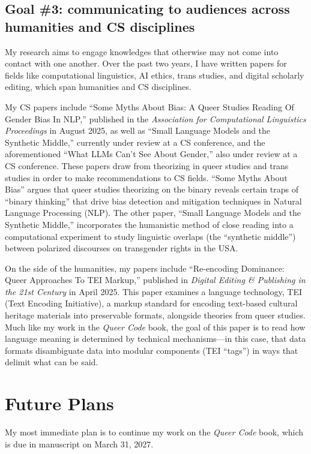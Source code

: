 \documentclass[12pt]{article}
\begin{document}
\subsection*{Goal \#3: communicating to audiences across humanities and CS disciplines}
\label{sec:org2d70bbc}
My research aims to engage knowledges that otherwise may not come into
contact with one another. Over the past two years, I have written
papers for fields like computational linguistics, AI ethics, trans
studies, and digital scholarly editing, which span humanities and CS
disciplines.

My CS papers include ``Some Myths About Bias: A Queer Studies Reading
Of Gender Bias In NLP,'' published in the \emph{Association for
Computational Linguistics Proceedings} in August 2025, as well as
``Small Language Models and the Synthetic Middle,'' currently under
review at a CS conference, and the aforementioned ``What LLMs Can't
See About Gender,'' also under review at a CS conference. These papers
draw from theorizing in queer studies and trans studies in order to
make recommendations to CS fields. ``Some Myths About Bias'' argues
that queer studies theorizing on the binary reveals certain traps of
``binary thinking'' that drive bias detection and mitigation
techniques in Natural Language Processing (NLP). The other paper,
``Small Language Models and the Synthetic Middle,'' incorporates the
humanistic method of close reading into a computational experiment to
study linguistic overlaps (the ``synthetic middle'') between polarized
discourses on transgender rights in the USA.

On the side of the humanities, my papers include ``Re-encoding
Dominance: Queer Approaches To TEI Markup,'' published in \emph{Digital
Editing \& Publishing in the 21st Century} in April 2025. This paper
examines a language technology, TEI (Text Encoding Initiative), a
markup standard for encoding text-based cultural heritage materials
into preservable formats, alongside theories from queer studies. Much
like my work in the \emph{Queer Code} book, the goal of this paper is to
read how language meaning is determined by technical mechanisms---in
this case, that data formats disambiguate data into modular components
(TEI ``tags'') in ways that delimit what can be said.

\section*{Future Plans}
\label{sec:org08f4cf5}
My most immediate plan is to continue my work on the \emph{Queer Code}
book, which is due in manuscript on March 31, 2027.
\end{document}
